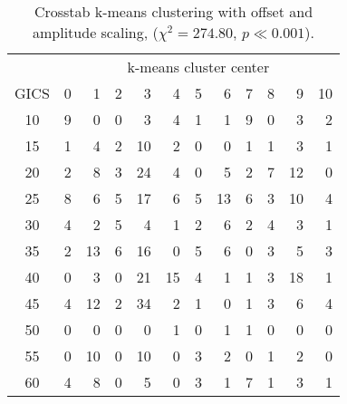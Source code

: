 \begin{table}[]
\centering
\caption{Crosstab k-means clustering with offset and amplitude scaling, ($\chi^2 = 274.80$, $p \ll 0.001$).}
\label{tbl:k-means-offset-amplitude}
\begin{tabular}{crrrrrrrrrrr} \toprule
	 & \multicolumn{11}{c}{k-means cluster center}     \\ \cmidrule{2-12}
	GICS & 0 & 1  & 2 & 3  & 4  & 5 & 6  & 7 & 8 & 9  & 10 \\ \midrule
	10 & 9 & 0  & 0 & 3  & 4  & 1 & 1  & 9 & 0 & 3  & 2  \\
	15 & 1 & 4  & 2 & 10 & 2  & 0 & 0  & 1 & 1 & 3  & 1  \\
	20 & 2 & 8  & 3 & 24 & 4  & 0 & 5  & 2 & 7 & 12 & 0  \\
	25 & 8 & 6  & 5 & 17 & 6  & 5 & 13 & 6 & 3 & 10 & 4  \\
	30 & 4 & 2  & 5 & 4  & 1  & 2 & 6  & 2 & 4 & 3  & 1  \\
	35 & 2 & 13 & 6 & 16 & 0  & 5 & 6  & 0 & 3 & 5  & 3  \\
	40 & 0 & 3  & 0 & 21 & 15 & 4 & 1  & 1 & 3 & 18 & 1  \\
	45 & 4 & 12 & 2 & 34 & 2  & 1 & 0  & 1 & 3 & 6  & 4  \\
	50 & 0 & 0  & 0 & 0  & 1  & 0 & 1  & 1 & 0 & 0  & 0  \\
	55 & 0 & 10 & 0 & 10 & 0  & 3 & 2  & 0 & 1 & 2  & 0  \\
	60 & 4 & 8  & 0 & 5  & 0  & 3 & 1  & 7 & 1 & 3  & 1 \\ \bottomrule
\end{tabular}
\end{table}